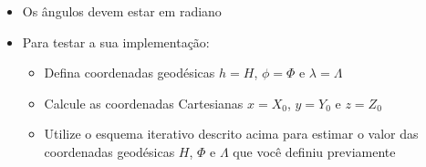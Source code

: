 \documentclass[10pt,a4paper]{article}
\begin{document}
\begin{itemize}

\item Os \^{a}ngulos devem estar em radiano

\item Para testar a sua implementaç\~{a}o:

\begin{itemize}

\item Defina coordenadas geod\'{e}sicas
      $h = H$, $\phi = \Phi$ e $\lambda = \Lambda$

\item Calcule as coordenadas Cartesianas $x = X_{0}$, 
      $y = Y_{0}$ e $z = Z_{0}$

\item Utilize o esquema iterativo descrito acima para
      estimar o valor das coordenadas geod\'{e}sicas 
      $H$, $\Phi$ e $\Lambda$ que voc\^{e} definiu
      previamente


\end{itemize}

\end{itemize}
\end{document}
